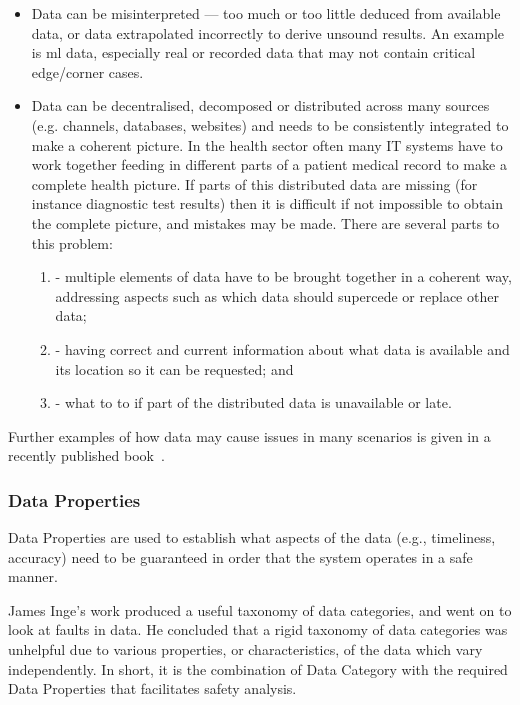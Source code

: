\begin{itemize}
  \item {} Data can be misinterpreted --- too much or too little deduced from available data, or data extrapolated incorrectly to derive unsound results.
    An example is \gls{ml} data, especially real or recorded data that may not contain critical edge/corner cases.

  \item {}
    Data can be decentralised, decomposed or distributed across many sources (e.g. channels, databases, websites) and needs to be consistently integrated to make a coherent picture. In the health sector often many IT systems have to work together feeding in different parts of a patient medical record to make a complete health picture. If parts of this distributed data are missing (for instance diagnostic test results) then it is difficult if not impossible to obtain the complete picture, and mistakes may be made.
    There are several parts to this problem:
    \begin{enumerate}[label=\alph*]
    	\item {} - multiple elements of data have to be brought together in a coherent way, addressing aspects such as which data should supercede or replace other data;
    	\item {} - having correct and current information about what data is available and its location so it can be requested; and
    	\item {} - what to to if part of the distributed data is unavailable or late.
    \end{enumerate}
\end{itemize}


Further examples of how data may cause issues in many scenarios is given in a recently published book~\cite{citation:datacentric}.

\subsubsection{Data Properties}\label{bkm:guidance:dataproperties}
Data Properties are used to establish what aspects of the data (e.g., timeliness, accuracy) need to be guaranteed in order that the system operates in a safe manner.

James Inge's work \cite{citation:inge2008improving} produced a useful taxonomy of data categories, and went on to look at faults in data. He concluded that a rigid taxonomy of data categories was unhelpful due to various properties, or characteristics, of the data which vary independently. In short, it is the combination of Data Category with the required Data Properties that facilitates safety analysis.

